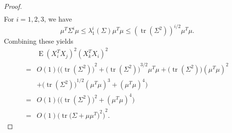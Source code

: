 \documentclass[smallcondensed,final,natbib]{svjour3}          %
\DeclareMathOperator{\mytr}{tr}
\DeclareMathOperator{\myE}{E}
\begin{document}
\begin{proof}
\begin{equation*}
\begin{aligned}
        \end{aligned}
    \end{equation*}
    For $i=1,2,3$, we have
    \begin{equation*}
    \mu^T \Sigma^i \mu
    \leq \lambda_{1}^i(\Sigma)\mu^T\mu
    \leq {(\mytr (\Sigma^2))}^{i/2}\mu^T\mu.
    \end{equation*}
        Combining these yields
        \begin{equation*}
        \begin{aligned}
            &\myE{(X_i^T X_j)}^2{(X_k^T X_i)}^2\\
            =&
            O(1)\Big({\big(\mytr (\Sigma^2)\big)}^2+
            {\big(\mytr (\Sigma^2)\big)}^{3/2}\mu^T \mu+
            {\big(\mytr (\Sigma^2)\big)}{(\mu^T \mu)}^2\\
            &+
            {\big(\mytr (\Sigma^2)\big)}^{1/2}{(\mu^T \mu)}^3+
            {(\mu^T \mu)}^4
            \Big)\\
            =&O(1)
            \Big(\big(\mytr(\Sigma^2)\big)^2 + (\mu^T \mu)^4 \Big)\\
            =& O(1){\Big(\mytr {\big(\Sigma+\mu\mu^T\big)}^2\Big)}^2.
        \end{aligned}
        \end{equation*}
\end{proof}
\end{document}
